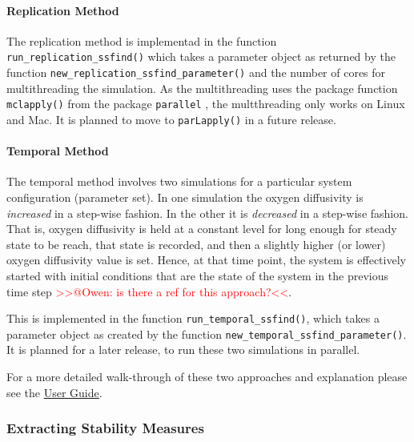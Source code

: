 \documentclass[]{elsarticle} %
\begin{document}
\hypertarget{replication-method}{%
\paragraph{Replication Method}\label{replication-method}}

The replication method is implementad in the function
\texttt{run\_replication\_ssfind()} which takes a parameter object as
returned by the function \texttt{new\_replication\_ssfind\_parameter()}
and the number of cores for multithreading the simulation. As the
multithreading uses the package function \texttt{mclapply()} from the
package \texttt{parallel} \citep{RCoreTeam2022}, the multthreading only
works on Linux and Mac. It is planned to move to \texttt{parLapply()}
\citep{RCoreTeam2022} in a future release.

\hypertarget{temporal-method}{%
\paragraph{Temporal Method}\label{temporal-method}}

The temporal method involves two simulations for a particular system
configuration (parameter set). In one simulation the oxygen diffusivity
is \emph{increased} in a step-wise fashion. In the other it is
\emph{decreased} in a step-wise fashion. That is, oxygen diffusivity is
held at a constant level for long enough for steady state to be reach,
that state is recorded, and then a slightly higher (or lower) oxygen
diffusivity value is set. Hence, at that time point, the system is
effectively started with initial conditions that are the state of the
system in the previous time step
\textcolor{red}{{>>@Owen: is there a ref for this approach?<<}}.

This is implemented in the function \texttt{run\_temporal\_ssfind()},
which takes a parameter object as created by the function
\texttt{new\_temporal\_ssfind\_parameter()}. It is planned for a later
release, to run these two simulations in parallel.

For a more detailed walk-through of these two approaches and explanation
please see the \href{@LINK_NEEDED}{User Guide}.

\hypertarget{extracting-stability-measures}{%
\subsubsection{Extracting Stability
Measures}\label{extracting-stability-measures}}
\end{document}
